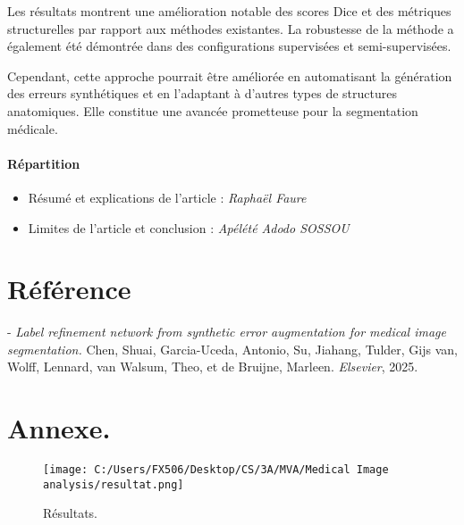 \documentclass[a4paper,12pt]{article}
\begin{document}
Les résultats montrent une amélioration notable des scores Dice et des métriques structurelles par rapport aux méthodes existantes. La robustesse de la méthode a également été démontrée dans des configurations supervisées et semi-supervisées. 

Cependant, cette approche pourrait être améliorée en automatisant la génération des erreurs synthétiques et en l’adaptant à d'autres types de structures anatomiques. Elle constitue une avancée prometteuse pour la segmentation médicale.

\paragraph{Répartition}

\begin{itemize}
    \item Résumé et explications de l'article : \textit{Raphaël Faure} \\
    \item Limites de l'article et conclusion : \textit{Apélété Adodo SOSSOU}
\end{itemize}

\section*{Référence}

- \textit{Label refinement network from synthetic error augmentation for medical image segmentation.} Chen, Shuai, Garcia-Uceda, Antonio, Su, Jiahang, Tulder, Gijs van, Wolff, Lennard, van Walsum, Theo, et de Bruijne, Marleen. \textit{Elsevier}, 2025.

\newpage
\section*{Annexe.}

\begin{figure}[h!]
    \centering
    \texttt{[image: C:/Users/FX506/Desktop/CS/3A/MVA/Medical Image analysis/resultat.png]}
    \caption{Résultats.}
    \label{fig:resultats}
\end{figure}
\end{document}
